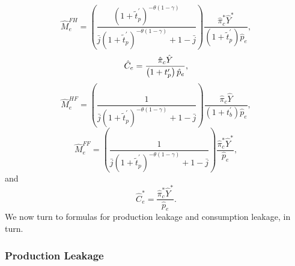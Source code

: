 \documentclass[notitlepage,12pt]{article}
\begin{document}
\begin{equation}
\hat{M}_{e}^{FH}=\left( \frac{\left( 1+\tilde{t}_{p}^{\prime }\right)
^{-\theta \left( 1-\gamma \right) }}{\bar{j}\left( 1+\tilde{t}_{p}^{\prime
}\right) ^{-\theta \left( 1-\gamma \right) }+1-\bar{j}}\right) \frac{\hat{\pi%
}_{c}^{\ast }\hat{Y}^{\ast }}{\left( 1+\tilde{t}_{p}^{\prime }\right) \hat{p}%
_{e}},  \label{MhatF}
\end{equation}%
\begin{equation}
\hat{C}_{e}=\frac{\hat{\pi}_{c}\hat{Y}}{\left( 1+t_{p}^{\prime }\right) \hat{%
p}_{e}},  \label{Chate}
\end{equation}%
\begin{equation}
\hat{M}_{e}^{HF}=\left( \frac{1}{\bar{j}\left( 1+\tilde{t}_{p}^{\prime
}\right) ^{-\theta \left( 1-\gamma \right) }+1-\bar{j}}\right) \frac{\hat{\pi%
}_{c}\hat{Y}}{\left( 1+t_{b}^{\prime }\right) \hat{p}_{e}},
\label{MhatHstar}
\end{equation}%
\begin{equation}
\hat{M}_{e}^{FF}=\left( \frac{1}{\bar{j}\left( 1+\tilde{t}_{p}^{\prime
}\right) ^{-\theta \left( 1-\gamma \right) }+1-\bar{j}}\right) \frac{\hat{\pi%
}_{c}^{\ast }\hat{Y}^{\ast }}{\hat{p}_{e}},  \label{MhatFstar}
\end{equation}%
and%
\begin{equation}
\hat{C}_{e}^{\ast }=\frac{\hat{\pi}_{c}^{\ast }\hat{Y}^{\ast }}{\hat{p}_{e}}.
\label{Chatestar}
\end{equation}%
We now turn to formulas for production leakage and consumption leakage, in
turn.

\subsubsection{Production Leakage}
\end{document}
